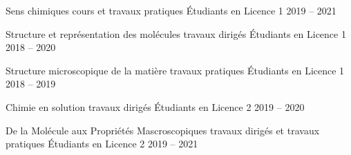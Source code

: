 
\begin{cvhonors}

  \cvhonor
  	{Sens chimiques}
  	{cours et travaux pratiques}
  	{Étudiants en Licence 1}
  	{2019 -- 2021}

  \cvhonor
    {Structure et représentation des molécules}
    {travaux dirigés}
    {Étudiants en Licence 1}
    {2018 -- 2020}

  \cvhonor
    {Structure microscopique de la matière}
    {travaux pratiques}
    {Étudiants en Licence 1}
    {2018 -- 2019}

  \cvhonor
  	{Chimie en solution}
  	{travaux dirigés}
  	{Étudiants en Licence 2}
  	{2019 -- 2020}

  \cvhonor
    {De la Molécule aux Propriétés Mascroscopiques}
    {travaux dirigés et travaux pratiques}
    {Étudiants en Licence 2}
    {2019 -- 2021}

\end{cvhonors}
